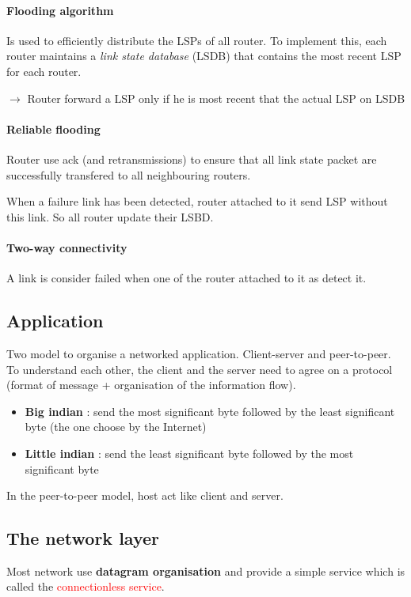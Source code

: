 \paragraph{\textbf{Flooding} algorithm}
Is used to efficiently distribute the LSPs of all router.
To implement this, each router maintains a \textit{link state database} (LSDB) that
contains the most recent LSP for each router. 

$\to$ Router forward a LSP only if he is most recent that the actual LSP on LSDB

\paragraph{\textbf{Reliable flooding}} Router use ack (and retransmissions) to ensure that
all link state packet are successfully transfered to all neighbouring routers. 

When a failure link has been detected, router attached to it send LSP without this link. So all router update 
their LSBD. 
\paragraph{Two-way connectivity} A link is consider failed when one of the router attached to it as detect it.

\subsection{Application}
Two model to organise a networked application. Client-server and peer-to-peer.
To understand each other, the client and the server need to agree on a protocol (format of message + 
organisation of the information flow).
\begin{itemize}
    \item \textbf{Big indian} :  send the most significant byte followed by the least significant byte (the one 
    choose by the Internet)
    \item \textbf{Little indian} : send the least significant byte followed by the most significant byte
\end{itemize}
 In the peer-to-peer model, host act like client and server.


\subsection{The network layer}
Most network use \textbf{datagram organisation} and provide a simple service
which is called the \textcolor{red}{connectionless service}. 

